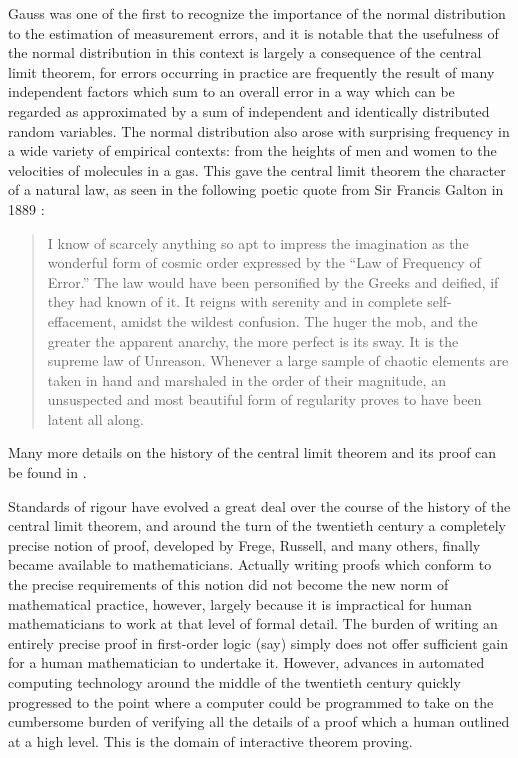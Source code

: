 \documentclass[leqno]{article}
\theoremstyle{definition}
\begin{document}
Gauss was one of the first to recognize the importance of the normal distribution to the estimation of measurement errors, and it is notable that the usefulness of the normal distribution in this context is largely a consequence of the central limit theorem, for errors occurring in practice are frequently the result of many independent factors which sum to an overall error in a way which can be regarded as approximated by a sum of independent and identically distributed random variables. The normal distribution also arose with surprising frequency in a wide variety of empirical contexts: from the heights of men and women to the velocities of molecules in a gas. This gave the central limit theorem the character of a natural law, as seen in the following poetic quote from Sir Francis Galton in 1889 \cite{galton}:
\begin{quote}
 I know of scarcely anything so apt to impress the imagination as the wonderful form of cosmic order expressed by the ``Law of Frequency of Error.'' The law would have been personified by the Greeks and deified, if they had known of it. It reigns with serenity and in complete self-effacement, amidst the wildest confusion. The huger the mob, and the greater the apparent anarchy, the more perfect is its sway. It is the supreme law of Unreason. Whenever a large sample of chaotic elements are taken in hand and marshaled in the order of their magnitude, an unsuspected and most beautiful form of regularity proves to have been latent all along.
\end{quote}
Many more details on the history of the central limit theorem and its proof can be found in \cite{fischer}.

Standards of rigour have evolved a great deal over the course of the history of the central limit theorem, and around the turn of the twentieth century a completely precise notion of proof, developed by Frege, Russell, and many others, finally became available to mathematicians. Actually writing proofs which conform to the precise requirements of this notion did not become the new norm of mathematical practice, however, largely because it is impractical for human mathematicians to work at that level of formal detail. The burden of writing an entirely precise proof in first-order logic (say) simply does not offer sufficient gain for a human mathematician to undertake it. However, advances in automated computing technology around the middle of the twentieth century quickly progressed to the point where a computer could be programmed to take on the cumbersome burden of verifying all the details of a proof which a human outlined at a high level. This is the domain of interactive theorem proving.
\end{document}
